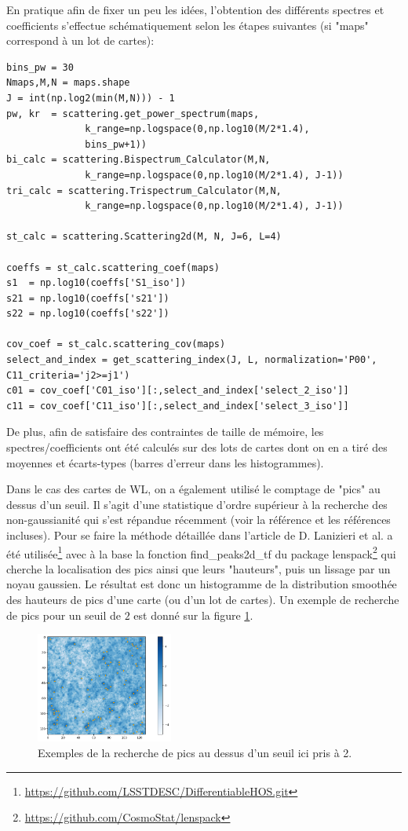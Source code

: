 \documentclass[12pt,twoside]{article}
\begin{document}
En pratique afin de fixer un peu les idées, l'obtention des différents spectres et coefficients  s'effectue schématiquement selon les étapes suivantes (si "maps" correspond à un lot de cartes):
\begin{lstlisting}[language=iPython]
bins_pw = 30
Nmaps,M,N = maps.shape
J = int(np.log2(min(M,N))) - 1
pw, kr  = scattering.get_power_spectrum(maps,
              k_range=np.logspace(0,np.log10(M/2*1.4), 
              bins_pw+1))
bi_calc = scattering.Bispectrum_Calculator(M,N, 
              k_range=np.logspace(0,np.log10(M/2*1.4), J-1))
tri_calc = scattering.Trispectrum_Calculator(M,N,
              k_range=np.logspace(0,np.log10(M/2*1.4), J-1))

st_calc = scattering.Scattering2d(M, N, J=6, L=4)

coeffs = st_calc.scattering_coef(maps)
s1  = np.log10(coeffs['S1_iso'])
s21 = np.log10(coeffs['s21'])
s22 = np.log10(coeffs['s22'])

cov_coef = st_calc.scattering_cov(maps)
select_and_index = get_scattering_index(J, L, normalization='P00', C11_criteria='j2>=j1')
c01 = cov_coef['C01_iso'][:,select_and_index['select_2_iso']]
c11 = cov_coef['C11_iso'][:,select_and_index['select_3_iso']]
\end{lstlisting}
De plus, afin de satisfaire des contraintes de taille de mémoire, les spectres/coefficients ont été calculés sur des lots de cartes dont on en a tiré des moyennes et écarts-types (barres d'erreur dans les histogrammes).

Dans le cas des cartes de WL, on a également utilisé le comptage de "pics" au dessus d'un seuil. Il s'agit d'une statistique d'ordre supérieur à la recherche des non-gaussianité qui s'est répandue récemment (voir la référence \cite{2023arXiv230507531L} et les références incluses). Pour se faire la méthode détaillée dans l'article de D. Lanizieri et al. a été utilisée\footnote{\url{https://github.com/LSSTDESC/DifferentiableHOS.git}} avec à la base la fonction \textsf{find\_peaks2d\_tf} du package \textsf{lenspack}\footnote{\url{https://github.com/CosmoStat/lenspack}} qui cherche la localisation des pics ainsi que leurs "hauteurs", puis un lissage par un noyau gaussien. Le résultat est donc un histogramme de la distribution smoothée des hauteurs de pics d'une carte (ou d'un lot de cartes). Un exemple de recherche de pics pour un seuil de $2$ est donné sur la figure \ref{fig-WL-peakcount-thr2-exemple}.
\begin{figure}
\centering
\includegraphics[width=0.4\textwidth]{fig-WL-peakcount-thr2-exemple.png}
\caption{Exemples de la recherche de pics au dessus d'un seuil ici pris à 2.}
\label{fig-WL-peakcount-thr2-exemple}
\end{figure}
%
\end{document}
